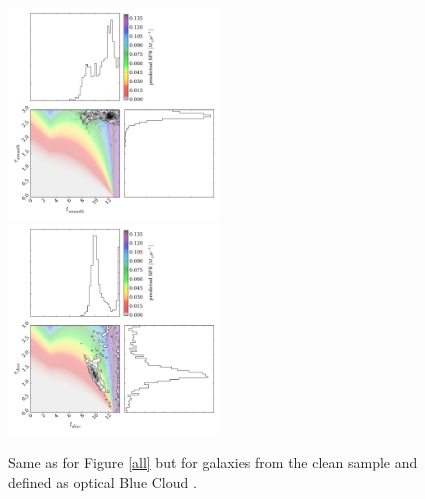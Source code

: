 \documentclass{mn2e}
\begin{document}
\begin{figure}
\includegraphics[width=0.4975\textwidth]{blue_c_smooth_clean.pdf}
\includegraphics[width=0.4975\textwidth]{blue_c_disc_clean.pdf}
\caption{Same as for Figure \ref{all} but for galaxies from the clean sample and defined as optical Blue Cloud \cite{Baldry}.}
\label{blue_c_clean}
\end{figure}

\end{document}
